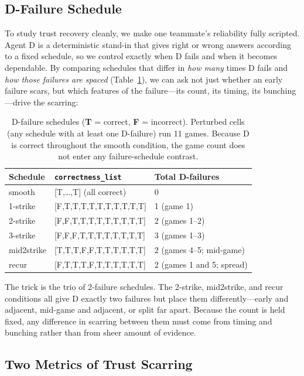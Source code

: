 \documentclass{article}
\begin{document}
\subsection{D-Failure Schedule}

To study trust recovery cleanly, we make one teammate's reliability fully scripted. Agent D is a deterministic stand-in that gives right or wrong answers according to a fixed schedule, so we control exactly when D fails and when it becomes dependable. By comparing schedules that differ in \emph{how many} times D fails and \emph{how those failures are spaced} (Table~\ref{tab:schedules}), we can ask not just whether an early failure scars, but which features of the failure---its count, its timing, its bunching---drive the scarring:

\begin{table}[h]
\centering
\caption{D-failure schedules (\textbf{T} = correct, \textbf{F} = incorrect). Perturbed cells (any schedule with at least one D-failure) run 11 games. Because D is correct throughout the smooth condition, the game count does not enter any failure-schedule contrast.}
\label{tab:schedules}
\small
\begin{tabular}{lll}
\toprule
Schedule & \texttt{correctness\_list} & Total D-failures \\
\midrule
smooth        & [T,\ldots,T] (all correct) & 0 \\
1-strike      & [F,T,T,T,T,T,T,T,T,T,T] & 1 (game 1) \\
2-strike      & [F,F,T,T,T,T,T,T,T,T,T] & 2 (games 1--2) \\
3-strike      & [F,F,F,T,T,T,T,T,T,T,T] & 3 (games 1--3) \\
mid2strike    & [T,T,T,F,F,T,T,T,T,T,T] & 2 (games 4--5; mid-game) \\
recur         & [F,T,T,T,F,T,T,T,T,T,T] & 2 (games 1 and 5; spread) \\
\bottomrule
\end{tabular}
\end{table}

\noindent The trick is the trio of 2-failure schedules. The 2-strike, mid2strike, and recur conditions all give D exactly two failures but place them differently---early and adjacent, mid-game and adjacent, or split far apart. Because the count is held fixed, any difference in scarring between them must come from timing and bunching rather than from sheer amount of evidence.

\subsection{Two Metrics of Trust Scarring}
\label{sec:metrics}
\end{document}
